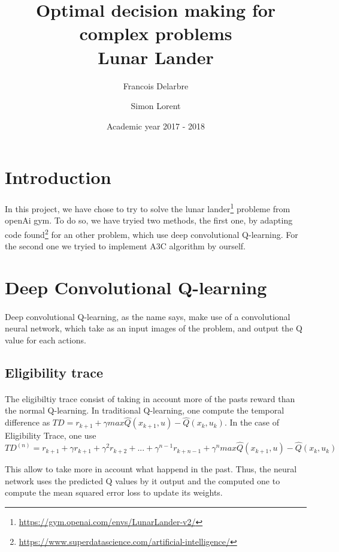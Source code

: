 \documentclass[14pt,a4paper,oneside]{report}
\title{\textbf{Optimal decision making for complex problems}
\\ Lunar Lander}
\author{Francois Delarbre \and Simon Lorent}
\begin{document}
\vfill
\date{Academic year 2017 - 2018}

\maketitle

\section{Introduction}
\paragraph{} In this project, we have chose to try to solve the lunar lander\footnote{\url{https://gym.openai.com/envs/LunarLander-v2/}} probleme from openAi gym. To do so, we have tryied two methods, the first one, by adapting code found\footnote{\url{https://www.superdatascience.com/artificial-intelligence/}} for an other problem, which use deep convolutional Q-learning. For the second one we tryied to implement A3C algorithm by ourself. 

\section{Deep Convolutional Q-learning}
\paragraph{} Deep convolutional Q-learning, as the name says, make use of a convolutional neural network, which take as an input images of the problem, and output the Q value for each actions. 
\subsection{Eligibility trace}
\paragraph{} The eligibiltiy trace consist of taking in account more of the pasts reward than the normal Q-learning. In traditional Q-learning, one compute the temporal difference as $TD = r_{k+1} + \gamma max\hat{Q}(x_{k+1}, u) − \hat{Q}(x_k, u_k)$. In the case of Eligibility Trace, one use $$TD^{(n)} = r_{k+1} + \gamma r_{k+1} + \gamma^2  r_{k+2} + ... + \gamma^{n-1}  r_{k+n-1} + \gamma^n max\hat{Q}(x_{k+1}, u) − \hat{Q}(x_k, u_k)$$

This allow to take more in account what happend in the past. Thus, the neural network uses the predicted Q values by it output and the computed one to compute the mean squared error loss  to update its weights. 
\end{document}

